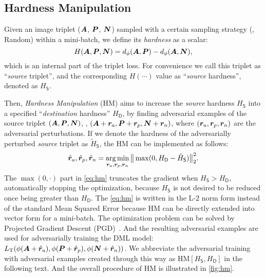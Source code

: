 \documentclass[10pt,twocolumn,letterpaper]{article}
\begin{document}
\subsection{Hardness Manipulation}
\label{sec:31}


Given an image triplet (${\bm{A}}$, ${\bm{P}}$, ${\bm{N}}$) sampled with a certain sampling
strategy (\eg, Random) within a mini-batch, we define its
\emph{hardness} as a scalar:
%
\begin{equation}
%
H(\mA,\mP,\mN)=d_\phi(\mA,\mP)-d_\phi(\mA,\mN),
%
\end{equation}
%
which is an internal part of the triplet loss.
%
For convenience we call this triplet as ``\emph{source} triplet'', and the
corresponding $H(\cdots)$ value as ``\emph{source} hardness'', denoted as
$H_\mathsf{S}$.


Then, \emph{Hardness Manipulation} (HM) aims to increase the \emph{source}
hardness $H_\mathsf{S}$ into a specified ``\emph{destination} hardness''
$H_\mathsf{D}$, by finding adversarial examples of the source triplet $({\bm{A}},
{\bm{P}}, {\bm{N}})$, \ie, $({\bm{A}} + {{\bm{r}}}_a, {\bm{P}} + {{\bm{r}}}_p, {\bm{N}} + {{\bm{r}}}_n)$, where
$({{\bm{r}}}_a, {{\bm{r}}}_p, {{\bm{r}}}_n)$ are the adversarial perturbations.
%
If we denote the hardness of the adversarially perturbed \emph{source} triplet
as $\tilde{H}_\mathsf{S}$, the HM can be implemented as follows:
%
\begin{equation}
	\hat{{\bm{r}}}_a, \hat{{\bm{r}}}_p, \hat{{\bm{r}}}_n = \operatorname*{arg\,min}_{{\bm{r}}_a,{\bm{r}}_p,{\bm{r}}_n}
	\big\|\max(0, H_\mathsf{D} - \tilde{H}_\mathsf{S} ) \big\|_2^2.
	\label{eq:hm}
\end{equation}
%
The $\max(0,\cdot)$ part in \cref{eq:hm} truncates the gradient when
$H_\mathsf{S}>H_\mathsf{D}$, automatically stopping the optimization, because
$H_\mathsf{S}$ is not desired to be reduced once being greater than
$H_\mathsf{D}$.
%
The \cref{eq:hm} is written in the L-$2$ norm form instead of the standard Mean Squared
Error because HM can be directly extended into vector form for a
mini-batch.
%
The optimization problem can be solved by Projected Gradient
Descent (PGD)~\cite{madry}.
%
And the resulting adversarial examples are used for adversarially training the
DML model:
%
$L_\text{T}(\phi({\bm{A}}+\hat{{\bm{r}}}_a), \phi({\bm{P}}+\hat{{\bm{r}}}_p),
\phi({\bm{N}}+\hat{{\bm{r}}}_n))$.
%
We abbreviate the adversarial training with adversarial examples created through
this way as $\text{HM}[H_\mathsf{S},H_\mathsf{D}]$ in the following text.
%
And the overall procedure of HM is illustrated in \cref{fig:hm}.
\end{document}
